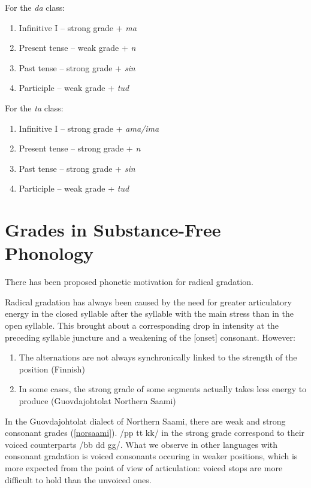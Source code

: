 \documentclass[a4paper, 12pt]{article}
\begin{document}
\begin{enumerate}[$\gg$]
	\begin{minipage}{.45\textwidth}
	For the \emph{da} class:
		\begin{enumerate}[$\cdot$]
		\setlength\itemsep{0em}
			\item Infinitive I -- strong grade + \emph{ma}
			\item Present tense -- weak grade + \emph{n}
			\item Past tense -- strong grade + \emph{sin}
			\item Participle -- weak grade + \emph{tud}
		\end{enumerate}
	\end{minipage}
	\hfill
	\begin{minipage}{.45\textwidth}
	For the \emph{ta} class:
		\begin{enumerate}[$\cdot$]
		\setlength\itemsep{0em}
			\item Infinitive I -- strong grade + \emph{ama/ima}
			\item Present tense -- strong grade + \emph{n}
			\item Past tense -- strong grade + \emph{sin}
			\item Participle -- weak grade + \emph{tud}
		\end{enumerate}
	\end{minipage}
\end{enumerate}
	
		\section{Grades in Substance-Free Phonology}
		
	There has been proposed phonetic motivation for radical gradation.
	
	\pex Radical gradation has always been caused by the need for greater articulatory energy in the closed syllable after the syllable with the main stress than in the open syllable. This brought about a corresponding drop in intensity at the preceding syllable juncture and a weakening of the [onset] consonant. 
	\xe
	However:
		
	\begin{enumerate}[$\gg$]
		\item The alternations are not always synchronically linked to the strength of the position (Finnish)
		\item In some cases, the strong grade of some segments actually takes less energy to produce (Guovdajohtolat Northern Saami)
	\end{enumerate}
	In the Guovdajohtolat dialect of Northern Saami, there are weak and strong consonant grades (\ref{norsaami}). /pp tt kk/ in the strong grade correspond to their voiced counterparts /bb dd gg/. What we observe in other languages with consonant gradation is voiced consonants occuring in weaker positions, which is more expected from the point of view of articulation: voiced stops are more difficult to hold than the unvoiced ones.
	
\end{document}
